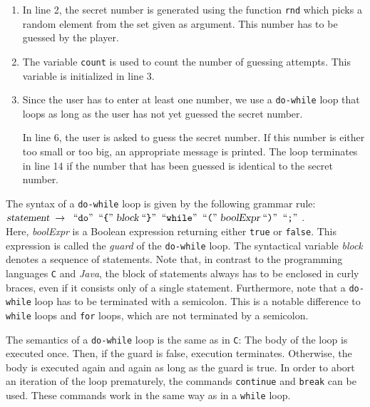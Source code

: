 \begin{enumerate}
\item In line 2, the secret number is generated using the function \texttt{rnd} which picks a random
      element from the set given as argument.  This number has to be guessed by the player.
\item The variable \texttt{count} is used to count the number of guessing attempts.
      This variable is initialized in line 3.
\item Since the user has to enter at least one number, we use a \texttt{do-while} loop that loops as
      long as the user has not yet guessed the secret number.

      In line 6, the user is asked to guess the secret number.  If this number is either too small
      or too big, an appropriate message is printed.  The loop terminates in line 14 if the number
      that has been guessed is identical to the secret number.
\end{enumerate}

\noindent
The syntax of a \texttt{do-while} loop is given by the following grammar rule:
\\[0.2cm]
\hspace*{1.3cm}
$\textsl{statement} \;\rightarrow\; \;\mbox{``\texttt{do}''}\; \;\mbox{``\texttt{\{}''}\;  \textsl{block} \;\mbox{``\texttt{\}}''}\; \;\mbox{``\texttt{while}''}\;
  \;\mbox{``\texttt{(}''}\; \textsl{boolExpr} \;\mbox{``\texttt{)}''}\; \;\mbox{``\texttt{;}''}\; 
$.
\\[0.2cm]
Here, \textsl{boolExpr} is a Boolean expression returning either \texttt{true} or
\texttt{false}.  This expression is called the \emph{guard} of the \texttt{do-while} loop.
The syntactical variable \textsl{block} denotes a sequence of statements.  Note that, 
in contrast to the programming languages \texttt{C} and \textsl{Java}, the
block of statements always has to be enclosed in curly braces, even if it consists only of a
single statement.  Furthermore, note that a \texttt{do-while} loop has to be terminated with a
semicolon.  This is a notable difference to \texttt{while} loops and \texttt{for} loops, which are
not terminated by a semicolon.

The semantics of a \texttt{do-while} loop is the same as in \texttt{C}:
The body of the loop is executed once.  Then, if the guard is false, execution terminates.  Otherwise,
the body is executed again and again as long as the guard is true.  In order
to abort an iteration of the loop prematurely, the commands \texttt{continue} and
\texttt{break} can be used.  These commands work in the same way as in a \texttt{while} loop.

